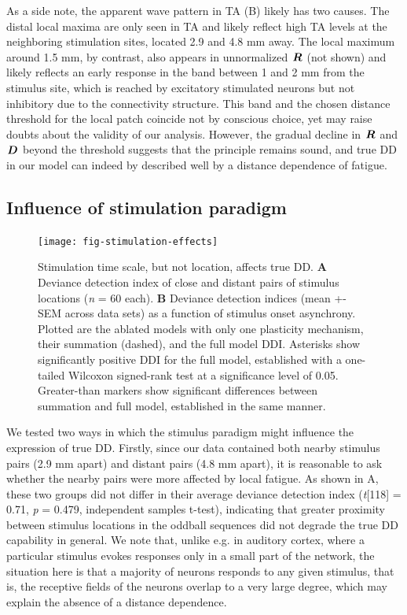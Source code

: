 \documentclass[9pt,lineno,onehalfspacing]{elife}
\newcommand{\dev}{\textit{A-as-dev}}
\newcommand{\msc}{\textit{A-in-con}}
\newcommand{\std}{\textit{A-as-std}}
\newcommand{\ifstringequal}[4]{%
  \ifnum\pdfstrcmp{#1}{#2}=0
  #3%
  \else
  #4%
  \fi
}
\newcommand{\seqreplace}[1]{\ifstringequal{dev}{#1}{\dev}{%
    \ifstringequal{std}{#1}{\std}{%
        \ifstringequal{msc}{#1}{\msc}{#1}%
    }%
}}
\newcommand{\R}[3][]{{}^{\seqreplace{#1}}_{}\boldsymbol R^{#2}_{#3}}
\newcommand{\D}[3][]{{}^{\seqreplace{#1}}_{}\boldsymbol D^{#2}_{#3}}
\begin{document}
As a side note, the apparent wave pattern in TA (B) likely has two causes. The distal local maxima are only seen in TA and likely reflect high TA levels at the neighboring stimulation sites, located 2.9 and 4.8 mm away. The local maximum around 1.5 mm, by contrast, also appears in unnormalized $\R{}{}$ (not shown) and likely reflects an early response in the band between 1 and 2 mm from the stimulus site, which is reached by excitatory stimulated neurons but not inhibitory due to the connectivity structure. This band and the chosen distance threshold for the local patch coincide not by conscious choice, yet may raise doubts about the validity of our analysis. However, the gradual decline in $\R{}{}$ and $\D{}{}$ beyond the threshold suggests that the principle remains sound, and true DD in our model can indeed by described well by a distance dependence of fatigue.

\subsection{Influence of stimulation paradigm}

\begin{figure}
    \texttt{[image: fig-stimulation-effects]}
    \caption{%
        Stimulation time scale, but not location, affects true DD.
        \textbf{A} Deviance detection index of close and distant pairs of stimulus locations (\textit{n} = 60 each).
        \textbf{B} Deviance detection indices (mean +- SEM across data sets) as a function of stimulus onset asynchrony. Plotted are the ablated models with only one plasticity mechanism, their summation (dashed), and the full model DDI. Asterisks show significantly positive DDI for the full model, established with a one-tailed Wilcoxon signed-rank test at a significance level of 0.05. Greater-than markers show significant differences between summation and full model, established in the same manner.
    }
    \label{fig:stimulation-effects}
\end{figure}

We tested two ways in which the stimulus paradigm might influence the expression of true DD. Firstly, since our data contained both nearby stimulus pairs (2.9 mm apart) and distant pairs (4.8 mm apart), it is reasonable to ask whether the nearby pairs were more affected by local fatigue. As shown in A, these two groups did not differ in their average deviance detection index (\textit{t}[118] = 0.71, \textit{p} = 0.479, independent samples t-test), indicating that greater proximity between stimulus locations in the oddball sequences did not degrade the true DD capability in general.
We note that, unlike e.g. in auditory cortex, where a particular stimulus evokes responses only in a small part of the network, the situation here is that a majority of neurons responds to any given stimulus, that is, the receptive fields of the neurons overlap to a very large degree, which may explain the absence of a distance dependence.
\end{document}
